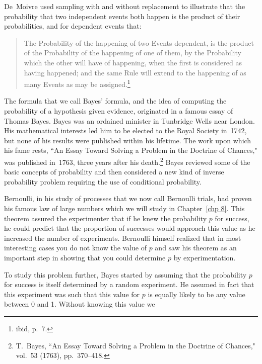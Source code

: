 De~Moivre used sampling with and without replacement to illustrate that the
probability that two independent events both happen is the product of their
probabilities, and for dependent events that:
\begin{quote}
The Probability of the happening of two Events dependent, is the product of the
Probability of the happening of one of them, by the Probability which the other
will have of happening, when the first is considered as having happened; and
the same Rule will extend to the happening of as many Events as may be
assigned.\footnote{ibid, p.~7.}
\end{quote}
\par
The formula that we call Bayes' formula, and the idea of computing the
probability of a hypothesis given evidence, originated in a famous essay of
Thomas Bayes.  Bayes was an ordained minister in Tunbridge Wells near London. 
His mathematical interests led him to be elected to the Royal Society in~1742,
but none of his results were published within his lifetime.  The work upon
which his fame rests, ``An Essay Toward Solving a Problem in the Doctrine of
Chances," was published in~1763, three years after his
death.\footnote{T.~Bayes, ``An Essay Toward Solving a Problem in the Doctrine
of Chances,"  vol.~53 (1763),
pp.~370--418.}  Bayes reviewed some of the basic concepts of probability and
then considered a new kind of inverse probability problem requiring the use of
conditional probability.
\par
Bernoulli, in his study of processes that we now call Bernoulli trials, had
proven his famous law of large numbers which we will study in Chapter~\ref{chp
8}.  This theorem assured the experimenter that if he knew the probability $p$
for success, he could predict that the proportion of successes would approach
this value as he increased the number of experiments.  Bernoulli himself
realized that in most interesting cases you do not know the value of $p$ and
saw his theorem as an important step in showing that you could determine $p$ by
experimentation.
\par
To study this problem further, Bayes started by assuming that the probability
$p$ for success is itself determined by a random experiment.  He assumed in
fact that this experiment was such that this value for $p$ is equally likely to
be any value between 0 and 1.  Without knowing this value we
